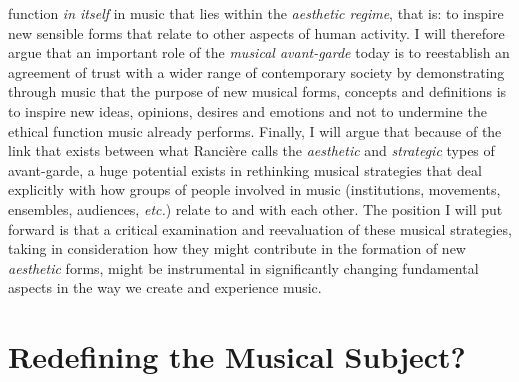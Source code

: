 function \emph{in itself} in music that lies within the \emph{aesthetic regime}, that is: to inspire new sensible forms that relate to other aspects of human activity. I will therefore argue that an important role of the \emph{musical avant-garde} today is to reestablish an agreement of trust with a wider range of contemporary society by demonstrating through music that the purpose of new musical forms, concepts and definitions is to inspire new ideas, opinions, desires and emotions and not to undermine the ethical function music already performs. Finally, I will argue that because of the link that exists between what Ranci\`{e}re calls the \emph{aesthetic} and \emph{strategic} types of avant-garde, a huge potential exists in rethinking musical strategies that deal explicitly with how groups of people involved in music (institutions, movements, ensembles, audiences, \emph{etc.}) relate to and with each other.  The position I will put forward is that a critical examination and reevaluation of these musical strategies, taking in consideration how they might contribute in the formation of new \emph{aesthetic} forms, might be instrumental in significantly changing fundamental aspects in the way we create and experience music.

\section{Redefining the Musical Subject?}

